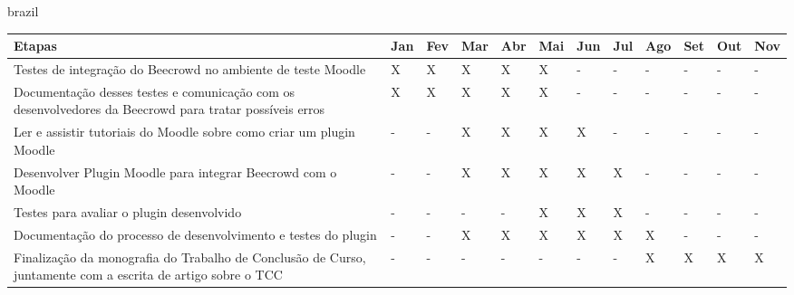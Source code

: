 \begin{otherlanguage*}{brazil}
    
    \begin{tabular}{ |p{3cm}||p{1cm}|p{1cm}|p{1cm}|p{1cm}|p{1cm}|p{1cm}|p{1cm}|p{1cm}|p{1cm}|p{1cm}|p{1cm}|  }
     \hline
     Etapas      & Jan & Fev & Mar & Abr & Mai & Jun & Jul & Ago & Set & Out & Nov      \\ \hline 
    \hline
    Testes de integração do Beecrowd no ambiente de teste Moodle           & X & X & X & X & X & - & - & - & - & - & -      \\ \hline
    Documentação desses testes e comunicação com os desenvolvedores da Beecrowd para tratar possíveis erros          & X & X & X & X & X & - & - & - & - & - & -      \\ \hline
    Ler e assistir tutoriais do Moodle sobre como criar um plugin Moodle           & - & - & X & X & X & X & - & - & - & - & -      \\ \hline
    Desenvolver Plugin Moodle para integrar Beecrowd com o Moodle           & - & - & X & X & X & X & X & - & - & - & -      \\ \hline
    Testes para avaliar o plugin desenvolvido           & - & - & - & - & X & X & X & - & - & - & -      \\ \hline
    Documentação do processo de desenvolvimento e testes do plugin           & - & - & X & X & X & X & X & X & - & - & -      \\ \hline
    Finalização da monografia do Trabalho de Conclusão de Curso, juntamente com a escrita de artigo sobre o TCC          & - & - & - & - & - & - & - & X & X & X & X      \\ \hline
    
     \hline
    \end{tabular}
    

\end{otherlanguage*}

